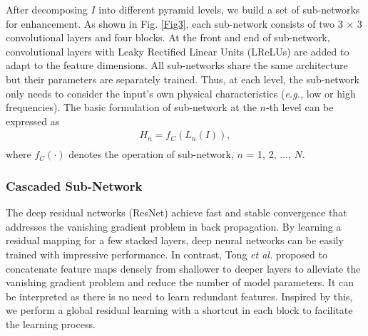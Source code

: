 \documentclass[journal]{IEEEtran}
\begin{document}
After decomposing \(I\) into different pyramid levels, we build a set of sub-networks for enhancement. As shown in Fig. \ref{Fig3}, each sub-network consists of two 3 \(\times\) 3 convolutional layers and four blocks. At the front and end of sub-network, convolutional layers with Leaky Rectified Linear Units (LReLUs) \cite{xu2015empirical} are added to adapt to the feature dimensions. All sub-networks share the
same architecture but their parameters are separately trained. Thus, at each level, the sub-network
only needs to consider the input's own physical characteristics
(\textit{e.g.,} low or high frequencies). The basic formulation of sub-network at the \(n\)-th level can be expressed as
 \begin{equation}
 \begin{aligned}
 H_{n}=f_{C}(L_{n}(I)),\\
 \end{aligned}
\end{equation}
where \(f_{C}(\cdot)\) denotes the operation of sub-network, \(n\) = 1, 2, ..., \(N\).


\subsubsection{Cascaded Sub-Network}
The deep residual networks (ResNet) achieve fast and stable convergence that addresses the vanishing gradient problem in back propagation. By learning a residual mapping for a few stacked layers, deep neural networks can be easily trained with impressive performance. In contrast, Tong \textit{et al.} \cite{tong2017image} proposed to concatenate feature maps densely from shallower to deeper layers to alleviate the vanishing gradient problem and reduce the number of model parameters. It can be interpreted as there is no need to learn redundant features. Inspired by this, we perform a global residual learning with a shortcut in each block to facilitate the learning process.
\end{document}

